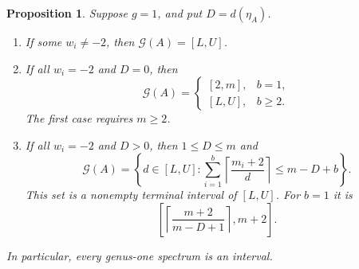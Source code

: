 \documentclass[11pt]{amsart}
\theoremstyle{definition}
\theoremstyle{plain}
\newtheorem{proposition}[proposition]{Proposition}
\theoremstyle{definition}
\theoremstyle{definition}
\newcommand{\GSpec}{\mathcal G}
\begin{document}
\begin{proposition}
\label{prop:classification-torus}
Suppose $g=1$, and put $D=d(\eta_A)$.
\begin{enumerate}[label=\textup{(\roman*)}]
\item If some $w_i\neq-2$, then $\GSpec(A)=[L,U]$.
\item If all $w_i=-2$ and $D=0$, then
\begin{equation}
\label{eq:classification-torus-zero}
 \GSpec(A)=
 \begin{cases}
  [2,m],&b=1,\\
  [L,U],&b\geq2.
 \end{cases}
\end{equation}
The first case requires $m\geq2$.
\item If all $w_i=-2$ and $D>0$, then $1\leq D\leq m$ and
\begin{equation}
\label{eq:classification-torus-positive}
 \GSpec(A)=
 \left\{d\in[L,U]:
    \sum_{i=1}^b\left\lceil\frac{m_i+2}{d}\right\rceil
       \leq m-D+b\right\}.
\end{equation}
This set is a nonempty terminal interval of $[L,U]$.  For $b=1$ it is
\begin{equation}
\label{eq:classification-torus-one-boundary}
 \left[\left\lceil\frac{m+2}{m-D+1}\right\rceil,m+2\right].
\end{equation}
\end{enumerate}
In particular, every genus-one spectrum is an interval.
\end{proposition}
\end{document}
